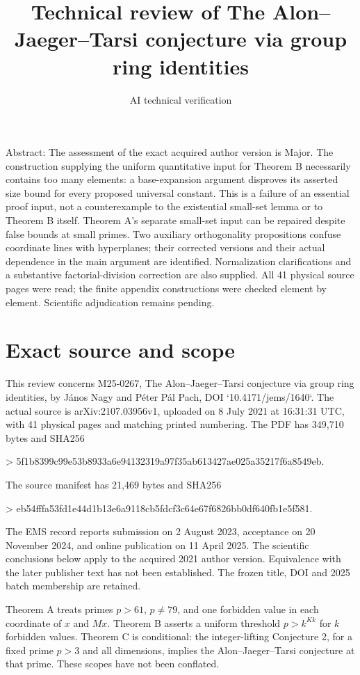 \documentclass[10pt]{article}
\title{Technical review of
The Alon–Jaeger–Tarsi conjecture via group ring identities}
\author{AI technical verification}
\date{}
\begin{document}
\maketitle
Abstract: The assessment of the exact acquired author version is Major. The construction supplying the uniform quantitative input for Theorem B necessarily contains too many elements: a base-expansion argument disproves its asserted size bound for every proposed universal constant. This is a failure of an essential proof input, not a counterexample to the existential small-set lemma or to Theorem B itself. Theorem A’s separate small-set input can be repaired despite false bounds at small primes. Two auxiliary orthogonality propositions confuse coordinate lines with hyperplanes; their corrected versions and their actual dependence in the main argument are identified. Normalization clarifications and a substantive factorial-division correction are also supplied. All 41 physical source pages were read; the finite appendix constructions were checked element by element. Scientific adjudication remains pending.\par
\section*{Exact source and scope}
This review concerns M25-0267, The Alon–Jaeger–Tarsi conjecture via group ring identities, by János Nagy and Péter Pál Pach, DOI `10.4171/jems/1640`. The actual source is arXiv:2107.03956v1, uploaded on 8 July 2021 at 16:31:31 UTC, with 41 physical pages and matching printed numbering. The PDF has 349,710 bytes and SHA256\par
> 5f1b8399c99e53b8933a6e94132319a97f35ab613427ae025a35217f6a8549eb.\par
The source manifest has 21,469 bytes and SHA256\par
> eb54fffa53fd1e44d1b13e6a9118cb5fdcf3c64e67f6826bb0df640fb1e5f581.\par
The EMS record reports submission on 2 August 2023, acceptance on 20 November 2024, and online publication on 11 April 2025. The scientific conclusions below apply to the acquired 2021 author version. Equivalence with the later publisher text has not been established. The frozen title, DOI and 2025 batch membership are retained.\par
Theorem A treats primes \(p>61\), \(p\ne79\), and one forbidden value in each coordinate of \(x\) and \(Mx\). Theorem B asserts a uniform threshold \(p>k^{Kk}\) for \(k\) forbidden values. Theorem C is conditional: the integer-lifting Conjecture 2, for a fixed prime \(p>3\) and all dimensions, implies the Alon–Jaeger–Tarsi conjecture at that prime. These scopes have not been conflated.\par
\end{document}
